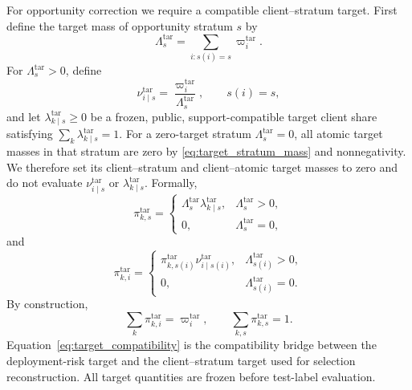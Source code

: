 \documentclass[letterpaper,journal]{IEEEtran}
\begin{document}
For opportunity correction we require a compatible client--stratum target.
First define the target mass of opportunity stratum $s$ by
\begin{equation}
    \Lambda_s^{\mathrm{tar}}
    =
    \sum_{i:s(i)=s}\varpi_i^{\mathrm{tar}}.
    \label{eq:target_stratum_mass}
\end{equation}
For $\Lambda_s^{\mathrm{tar}}>0$, define
\begin{equation}
    \nu^{\mathrm{tar}}_{i\mid s}
    =
    \frac{\varpi_i^{\mathrm{tar}}}
         {\Lambda_s^{\mathrm{tar}}},
    \qquad s(i)=s,
    \label{eq:target_conditional_atomic}
\end{equation}
and let $\lambda^{\mathrm{tar}}_{k\mid s}\ge0$ be a frozen, public,
support-compatible target client share satisfying
$\sum_k\lambda^{\mathrm{tar}}_{k\mid s}=1$.
For a zero-target stratum $\Lambda_s^{\mathrm{tar}}=0$, all atomic target
masses in that stratum are zero by \eqref{eq:target_stratum_mass} and
nonnegativity.  We therefore set its client--stratum and client--atomic target
masses to zero and do not evaluate $\nu^{\mathrm{tar}}_{i\mid s}$ or
$\lambda^{\mathrm{tar}}_{k\mid s}$.  Formally,
\begin{equation}
 \pi^{\mathrm{tar}}_{k,s}
 =
 \begin{cases}
 \Lambda_s^{\mathrm{tar}}\lambda^{\mathrm{tar}}_{k\mid s},
 & \Lambda_s^{\mathrm{tar}}>0,\\
 0, & \Lambda_s^{\mathrm{tar}}=0,
 \end{cases}
 \label{eq:target_ks_mass}
\end{equation}
and
\begin{equation}
 \pi^{\mathrm{tar}}_{k,i}
 =
 \begin{cases}
 \pi^{\mathrm{tar}}_{k,s(i)}
 \nu^{\mathrm{tar}}_{i\mid s(i)},
 & \Lambda_{s(i)}^{\mathrm{tar}}>0,\\
 0, & \Lambda_{s(i)}^{\mathrm{tar}}=0.
 \end{cases}
 \label{eq:target_ki_mass}
\end{equation}
By construction,
\begin{equation}
    \sum_k\pi^{\mathrm{tar}}_{k,i}
    =
    \varpi_i^{\mathrm{tar}},
    \qquad
    \sum_{k,s}\pi^{\mathrm{tar}}_{k,s}=1.
    \label{eq:target_compatibility}
\end{equation}
Equation~\eqref{eq:target_compatibility} is the compatibility bridge between the
deployment-risk target and the client--stratum target used for selection
reconstruction.  All target quantities are frozen before test-label evaluation.
\end{document}

